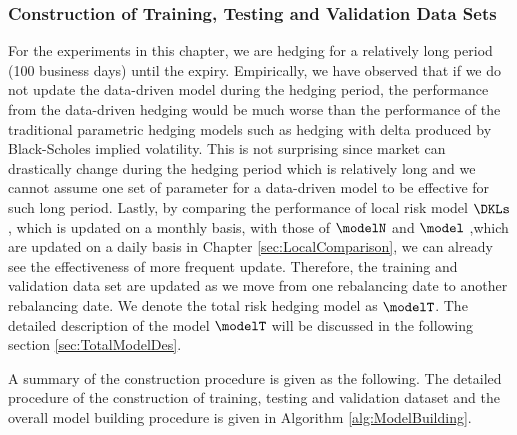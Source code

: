 \subsubsection{Construction of Training, Testing and Validation Data Sets}
For the experiments in this chapter, we are hedging for a relatively long period (100 business days) until the expiry.  Empirically, we have observed that if we do not update the data-driven model during the hedging period, the performance from the data-driven hedging would be much worse than the performance of the traditional parametric hedging models such as hedging with delta produced by Black-Scholes implied volatility. This is not surprising since market can drastically change during the hedging period which is relatively long and we cannot assume one set of parameter for a data-driven model to be effective for such long period. Lastly, by comparing the performance of local risk model  $\DKLs$, which is updated on a monthly basis,  with those of $\modelN$ and $\model$ ,which are updated on a daily basis in Chapter \ref{sec:LocalComparison}, we can already see the effectiveness of more frequent update.  Therefore, the training and validation data set are updated as we move from one rebalancing date to another rebalancing date. We denote the total risk hedging model as $\modelT$. The detailed description of the model $\modelT$ will be discussed in the following section \ref{sec:TotalModelDes}.

A summary of the construction procedure is given as the following. The detailed procedure of the construction of  training, testing and validation dataset and the overall model building procedure is given in Algorithm \ref{alg:ModelBuilding}.

